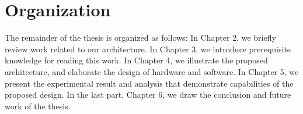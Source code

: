     \section{Organization}
    The remainder of the thesis is organized as follows: In Chapter 2, we briefly review work related to our architecture. In Chapter 3, we introduce prerequisite knowledge for reading this work. In Chapter 4, we illustrate the proposed architecture, and elaborate the design of hardware and software. In Chapter 5, we present the experimental result and analysis that demonstrate capabilities of the proposed design. In the last part, Chapter 6, we draw the conclusion and future work of the thesis.


